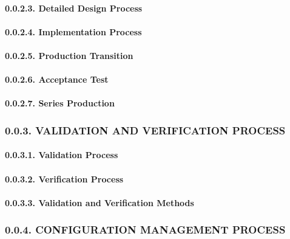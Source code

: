 \documentclass[]{article}
\let\oldparagraph\paragraph
\renewcommand{\paragraph}[1]{\oldparagraph{#1}\mbox{}}
\begin{document}
\paragraph{0.0.2.3. Detailed Design
Process}\label{detailed-design-process}

\paragraph{0.0.2.4. Implementation
Process}\label{implementation-process}

\paragraph{0.0.2.5. Production Transition}\label{production-transition}

\paragraph{0.0.2.6. Acceptance Test}\label{acceptance-test}

\paragraph{0.0.2.7. Series Production}\label{series-production}

\subsubsection{0.0.3. VALIDATION AND VERIFICATION
PROCESS}\label{validation-and-verification-process}

\paragraph{0.0.3.1. Validation Process}\label{validation-process}

\paragraph{0.0.3.2. Verification Process}\label{verification-process}

\paragraph{0.0.3.3. Validation and Verification
Methods}\label{validation-and-verification-methods}

\subsubsection{0.0.4. CONFIGURATION MANAGEMENT
PROCESS}\label{configuration-management-process}
\end{document}
